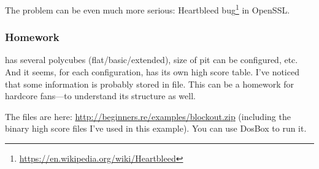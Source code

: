 The problem can be even much more serious: Heartbleed bug\footnote{\url{https://en.wikipedia.org/wiki/Heartbleed}}
in OpenSSL.

\subsubsection{Homework}

 has several polycubes (flat/basic/extended), size of pit can be configured, etc.
And it seems, for each configuration,  has its own high score table.
I've noticed that some information is probably stored in  file.
This can be a homework for hardcore  fans---to understand its structure as well.

The  files are here: \url{http://beginners.re/examples/blockout.zip}
(including the binary high score files I've used in this example).
You can use DosBox to run it.

